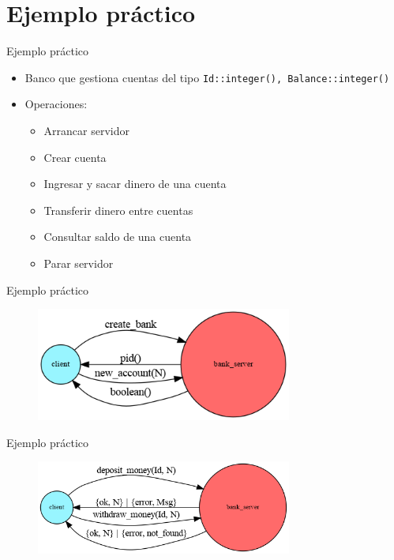 \documentclass{beamer}
\begin{document}
  \section{Ejemplo práctico}
    \begin{frame}{Ejemplo práctico}
      \begin{itemize}
        \item Banco que gestiona cuentas del tipo \texttt{{Id::integer(), Balance::integer()}}
        \item Operaciones:
        \begin{itemize}
          \item Arrancar servidor
          \item Crear cuenta
          \item Ingresar y sacar dinero de una cuenta
          \item Transferir dinero entre cuentas
          \item Consultar saldo de una cuenta
          \item Parar servidor
        \end{itemize}
      \end{itemize}
    \end{frame}

    \begin{frame}{Ejemplo práctico}
      \begin{figure}
        \includegraphics[width=0.75\textwidth]{create_bank-new_account.dot.png}
      \end{figure}
    \end{frame}

    \begin{frame}{Ejemplo práctico}
      \begin{figure}
        \includegraphics[width=0.75\textwidth]{deposit-withdraw_money.dot.png}
      \end{figure}
    \end{frame}
\end{document}
